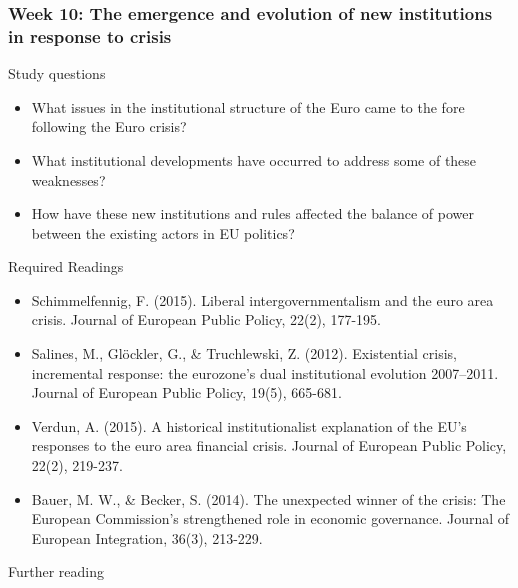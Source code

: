 \subsubsection*{Week 10: The emergence and evolution of new institutions in response to crisis}

Study questions

\begin{itemize}
	\item What issues in the institutional structure of the Euro came to the fore following the Euro crisis?
	\item What institutional developments have occurred to address some of these weaknesses?
	\item How have these new institutions and rules affected the balance of power between the existing actors in EU politics?
\end{itemize}

\noindent Required Readings

\begin{itemize}
	\item Schimmelfennig, F. (2015). Liberal intergovernmentalism and the euro area crisis. Journal of European Public Policy, 22(2), 177-195.
	\item Salines, M., Gl{\"o}ckler, G., \& Truchlewski, Z. (2012). Existential crisis, incremental response: the eurozone's dual institutional evolution 2007–2011. Journal of European Public Policy, 19(5), 665-681.
	\item Verdun, A. (2015). A historical institutionalist explanation of the EU's responses to the euro area financial crisis. Journal of European Public Policy, 22(2), 219-237.
	\item Bauer, M. W., \& Becker, S. (2014). The unexpected winner of the crisis: The European Commission’s strengthened role in economic governance. Journal of European Integration, 36(3), 213-229.
\end{itemize}

\noindent Further reading

